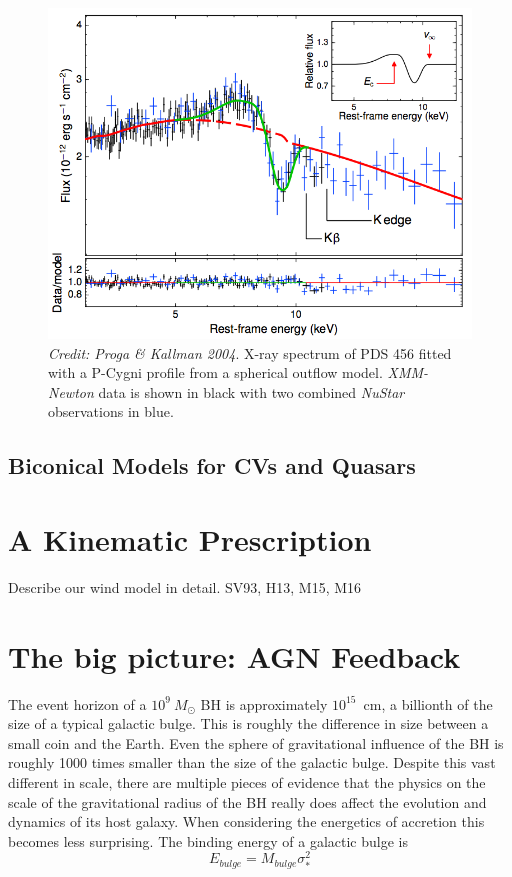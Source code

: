 \begin{figure}
\centering
\includegraphics[width=1.0\textwidth]{figures/02-outflows/nardini_pds456.png}
\caption
{
{\sl Credit: Proga \& Kallman 2004}. 
X-ray spectrum of PDS 456 fitted with a P-Cygni profile from a 
spherical outflow model. {\sl XMM-Newton} data is shown in black 
with two combined {\sl NuStar} observations in blue.
} 
\label{fig:nardini}
\end{figure}

\subsection{Biconical Models for CVs and Quasars}







\section{A Kinematic Prescription}

{
\color{blue}
Describe our wind model in detail. SV93, H13, M15, M16
}
\bigskip

\section{The big picture: AGN Feedback}
\label{sec:agn_feedback}

The event horizon of a $10^9~M_\odot$ BH is approximately 
$10^{15}$~cm, a billionth of the size of a typical galactic bulge. This is 
roughly the difference in size between a small coin and the 
Earth. Even the sphere of gravitational influence of the BH is roughly 
1000 times smaller than the size of the galactic bulge.
Despite this vast different in scale, there are multiple
pieces of evidence that the physics on the scale of the gravitational
radius of the BH really does affect the evolution and dynamics of its host galaxy.
When considering the energetics of accretion this becomes less surprising.
The binding energy of a galactic bulge is 
\begin{equation}
E_{bulge} = M_{bulge} \sigma_*^2
\end{equation}



